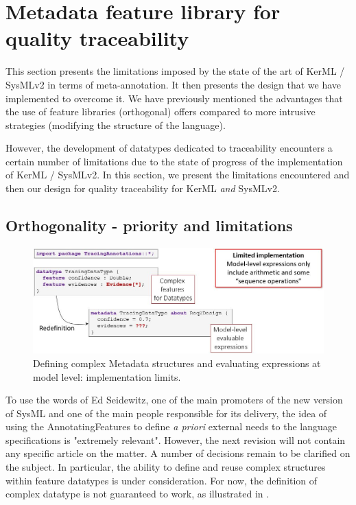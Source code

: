 \section{Metadata feature library for quality traceability}\label{sec:extension}

This section presents the limitations imposed by the state of the art of KerML / SysMLv2 in terms of meta-annotation. It then presents the design that we have implemented to overcome it.
\sideboxend
We have previously mentioned the advantages that the use of feature libraries  (orthogonal) offers compared to more intrusive strategies (modifying the structure of the language).

However, the development of datatypes dedicated to traceability encounters a certain number of limitations due to the state of progress of the implementation of KerML / SysMLv2. In this section, we present the limitations encountered and then our design for quality traceability for KerML \textit{and} SysMLv2.

\subsection{Orthogonality - priority and limitations}\label{sec:orthogonalite}
 
\begin{figure}[ht]     
	\centering
	\includegraphics[width=.99\linewidth]{images/strategy4-metadatatype.jpg}
	\caption{Defining complex Metadata structures and evaluating expressions at model level: implementation limits. }
	\label{fig:strategy4}
\end{figure}


To use the words of Ed Seidewitz, one of the main promoters of the new version of SysML and one of the main people responsible for its delivery, the idea of using the AnnotatingFeatures to define \textit{a priori} external needs to the language specifications is "extremely relevant". However, the next revision will not contain any specific article on the matter. A number of decisions remain to be clarified on the subject.
In particular, the ability to define and reuse complex structures within feature datatypes is under consideration. For now, the definition of complex datatype is not guaranteed to work, as illustrated in .

